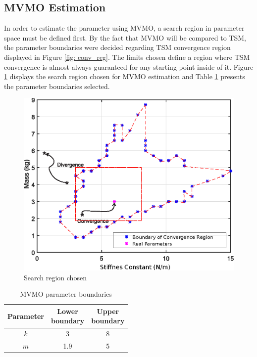 \subsection{MVMO Estimation}

In order to estimate the parameter using MVMO, a search region in parameter space must be defined first. By the fact that MVMO will be compared to TSM, the parameter boundaries were decided regarding TSM convergence region displayed in Figure \ref{fig: conv_reg}. The limits chosen define a region where TSM convergence is almost always guaranteed for any starting point inside of it. Figure \ref{fig: spring_mass_MVMO_region} displays the search region chosen for MVMO estimation and Table \ref{tab: spring_mass_MVMO_bounds} presents the parameter boundaries selected.

\begin{figure}[h]
	\caption{Search region chosen}
	\begin{center}
		\includegraphics[scale=0.6]{Images/search_region_MVMO.eps}
	\end{center}
	\label{fig: spring_mass_MVMO_region}
\end{figure}

\begin{table}[!h]
	\centering
	\caption{MVMO parameter boundaries}
	\begin{tabular}{c|cc}
		Parameter & \shortstack{Lower \\ boundary} & \shortstack{Upper \\ boundary} \\\hline
		$k$ & 3 & 8 \\
		$m$ & 1.9 & 5 \\
	\end{tabular}
	\label{tab: spring_mass_MVMO_bounds}
\end{table}

